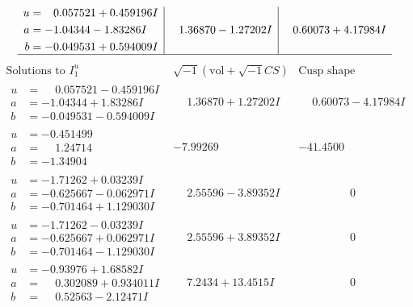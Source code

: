 \documentclass[1p]{elsarticle_modified}
\theoremstyle{definition}
\newcommand{\I}{\sqrt{-1}}
\begin{document}
$$\begin{array}{c|c|c}
\begin{aligned}
u &= \phantom{-}0.057521 + 0.459196 I \\
a &= -1.04344 - 1.83286 I \\
b &= -0.049531 + 0.594009 I\end{aligned}
 & \phantom{-}1.36870 - 1.27202 I & \phantom{-}0.60073 + 4.17984 I\\
 \hline 
 \end{array}$$\newpage$$\begin{array}{c|c|c}  
\text{Solutions to }I^u_{1}& \I (\text{vol} + \sqrt{-1}CS) & \text{Cusp shape}\\
 \hline 
\begin{aligned}
u &= \phantom{-}0.057521 - 0.459196 I \\
a &= -1.04344 + 1.83286 I \\
b &= -0.049531 - 0.594009 I\end{aligned}
 & \phantom{-}1.36870 + 1.27202 I & \phantom{-}0.60073 - 4.17984 I \\ \hline\begin{aligned}
u &= -0.451499\phantom{ +0.000000I} \\
a &= \phantom{-}1.24714\phantom{ +0.000000I} \\
b &= -1.34904\phantom{ +0.000000I}\end{aligned}
 & -7.99269\phantom{ +0.000000I} & -41.4500\phantom{ +0.000000I} \\ \hline\begin{aligned}
u &= -1.71262 + 0.03239 I \\
a &= -0.625667 - 0.062971 I \\
b &= -0.701464 + 1.129030 I\end{aligned}
 & \phantom{-}2.55596 - 3.89352 I & \phantom{-0.000000 } 0 \\ \hline\begin{aligned}
u &= -1.71262 - 0.03239 I \\
a &= -0.625667 + 0.062971 I \\
b &= -0.701464 - 1.129030 I\end{aligned}
 & \phantom{-}2.55596 + 3.89352 I & \phantom{-0.000000 } 0 \\ \hline\begin{aligned}
u &= -0.93976 + 1.68582 I \\
a &= \phantom{-}0.302089 + 0.934011 I \\
b &= \phantom{-}0.52563 - 2.12471 I\end{aligned}
 & \phantom{-}7.2434 + 13.4515 I & \phantom{-0.000000 } 0 \\ \hline\begin{aligned}

\end{aligned}
\end{array}$$
\end{document}
